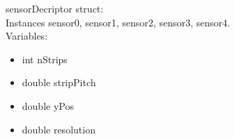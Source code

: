 \documentclass[aps,prd,superscriptaddress,floatfix]{revtex4}
\begin{document}
sensorDecriptor struct:\\
Instances sensor0, sensor1, sensor2, sensor3, sensor4.\\
Variables:\\
\begin{itemize}
\item int nStrips
\item double stripPitch
\item double yPos
\item double resolution
\end{itemize}






% 
\end{document}
